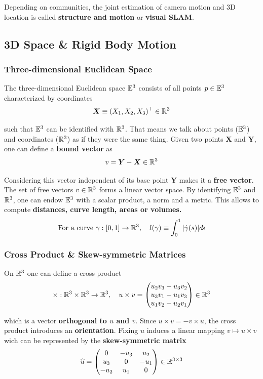 Depending on communities, the joint estimation of camera motion and 3D location is called
\textbf{structure and motion} or \textbf{visual SLAM}.

\subsection{3D Space \& Rigid Body Motion}%
\label{sub:3d_space_rigid_body_motion}


\subsubsection{Three-dimensional Euclidean Space}%
\label{ssub:three_dimensional_euclidean_space}

The three-dimensional Euclidean space $\E^3$ consists of all points
$p \in \E^3$ characterized by coordinates
	\[\bm{X} \equiv \tr{(X_1, X_2, X_3)} \in \R^3\]

such that $\E^3$ can be identified with $\R^3$.
That means we talk about points ($\E^3$) and coordinates ($\R^3$)
as if they were the same thing. Given two points $\bm{X}$ and $\bm{Y}$,
one can define a \textbf{bound vector} as
	\[v = \bm{Y} - \bm{X} \in \R^3\]

Considering this vector independent of its base point $\bm{Y}$ makes
it a \textbf{free vector}. The set of free vectors $v \in \R^3$
forms a linear vector space. By identifying $\E^3$ and $\R^3$,
one can endow $\E^3$ with a scalar product, a norm and a metric.
This allows to compute \textbf{distances, curve length, areas or volumes.}
\[\text{For a curve } \gamma : [0,1] \rightarrow \R^3,\quad
	l(\gamma) \equiv \int_{0}^1 | \dot{\gamma}(s) | d\!s\]


\subsubsection{Cross Product \& Skew-symmetric Matrices}%
\label{ssub:cross_product_and_skew_symmetric_matrices}

On $\R^3$ one can define a cross product
\[\times : \R^3 \times \R^3 \rightarrow \R^3,\quad u \times v =
	\begin{pmatrix}
		u_2v_3 - u_3v_2 \\
		u_3v_1 - u_1v_3 \\
		u_1v_2 - u_2v_1
	\end{pmatrix} \in \R^3\]

which is a vector \textbf{orthogonal to $u$ and $v$}.
Since $u \times v = -v \times u$, the cross product introduces an \textbf{orientation}.
Fixing $u$ induces a linear mapping $v \mapsto u \times v$ wich
can be represented by the \textbf{skew-symmetric matrix}
\[\widehat{u} = \hatmat{u_1}{u_2}{u_3} \in \RR{3}{3}\]


